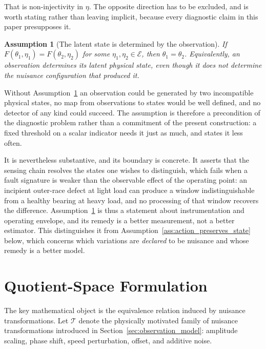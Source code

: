 \documentclass[a4paper]{cas-sc}
\newtheorem{assumption}{Assumption}
\newcommand{\EtaSpace}{\ensuremath{\mathcal{E}}}
\begin{document}
That is non-injectivity in \(\eta\). The opposite direction has to be excluded,
and is worth stating rather than leaving implicit, because every diagnostic
claim in this paper presupposes it.

\begin{assumption}[The latent state is determined by the observation]
\label{ass:state_identifiable}
If \(F(\theta_1,\eta_1)=F(\theta_2,\eta_2)\) for some
\(\eta_1,\eta_2\in\EtaSpace\), then \(\theta_1=\theta_2\). Equivalently, an
observation determines its latent physical state, even though it does not
determine the nuisance configuration that produced it.
\end{assumption}

Without Assumption~\ref{ass:state_identifiable} an observation could be
generated by two incompatible physical states, no map from observations to
states would be well defined, and no detector of any kind could succeed. The
assumption is therefore a precondition of the diagnostic problem rather than a
commitment of the present construction: a fixed threshold on a scalar
indicator needs it just as much, and states it less often.

It is nevertheless substantive, and its boundary is concrete. It asserts that
the sensing chain resolves the states one wishes to distinguish, which fails
when a fault signature is weaker than the observable effect of the operating
point: an incipient outer-race defect at light load can produce a window
indistinguishable from a healthy bearing at heavy load, and no processing of
that window recovers the difference. Assumption~\ref{ass:state_identifiable}
is thus a statement about instrumentation and operating envelope, and its
remedy is a better measurement, not a better estimator. This distinguishes it
from Assumption~\ref{ass:action_preserves_state} below, which concerns which
variations are \emph{declared} to be nuisance and whose remedy is a better
model.

\section{Quotient-Space Formulation}
\label{sec:quotient_formulation}

The key mathematical object is the equivalence relation induced by nuisance
transformations. Let \(\mathcal{T}\) denote the physically motivated family
of nuisance transformations introduced in
Section~\ref{sec:observation_model}: amplitude scaling, phase shift, speed
perturbation, offset, and additive noise.
\end{document}
